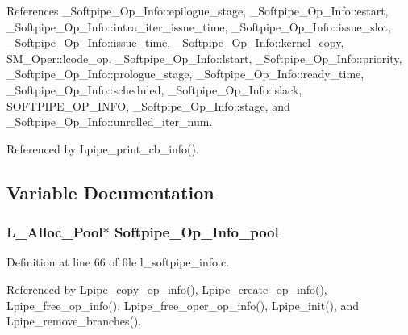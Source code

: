 References \_\-Softpipe\_\-Op\_\-Info::epilogue\_\-stage, \_\-Softpipe\_\-Op\_\-Info::estart, \_\-Softpipe\_\-Op\_\-Info::intra\_\-iter\_\-issue\_\-time, \_\-Softpipe\_\-Op\_\-Info::issue\_\-slot, \_\-Softpipe\_\-Op\_\-Info::issue\_\-time, \_\-Softpipe\_\-Op\_\-Info::kernel\_\-copy, SM\_\-Oper::lcode\_\-op, \_\-Softpipe\_\-Op\_\-Info::lstart, \_\-Softpipe\_\-Op\_\-Info::priority, \_\-Softpipe\_\-Op\_\-Info::prologue\_\-stage, \_\-Softpipe\_\-Op\_\-Info::ready\_\-time, \_\-Softpipe\_\-Op\_\-Info::scheduled, \_\-Softpipe\_\-Op\_\-Info::slack, SOFTPIPE\_\-OP\_\-INFO, \_\-Softpipe\_\-Op\_\-Info::stage, and \_\-Softpipe\_\-Op\_\-Info::unrolled\_\-iter\_\-num.

Referenced by Lpipe\_\-print\_\-cb\_\-info().

\subsection{Variable Documentation}
\subsubsection{\setlength{\rightskip}{0pt plus 5cm}L\_\-Alloc\_\-Pool$\ast$ \bf{Softpipe\_\-Op\_\-Info\_\-pool}}\label{l__softpipe__info_8h_bec30e2c6dd19674777250eed6a17946}




Definition at line 66 of file l\_\-softpipe\_\-info.c.

Referenced by Lpipe\_\-copy\_\-op\_\-info(), Lpipe\_\-create\_\-op\_\-info(), Lpipe\_\-free\_\-op\_\-info(), Lpipe\_\-free\_\-oper\_\-op\_\-info(), Lpipe\_\-init(), and Lpipe\_\-remove\_\-branches().